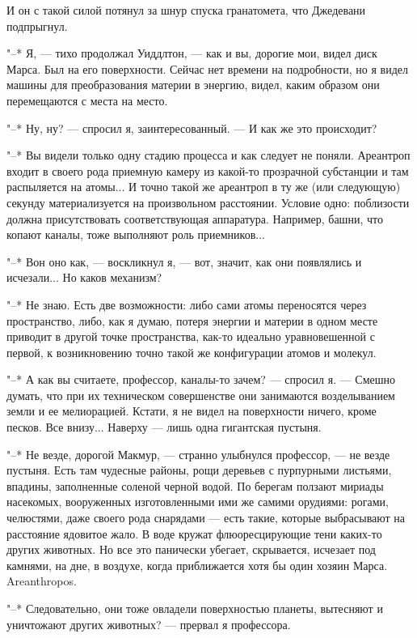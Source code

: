 И он с такой силой потянул за шнур спуска  гранатомета,  что  Джедевани
подпрыгнул.

"--* Я, --- тихо продолжал Уиддлтон, --- как и вы,  дорогие  мои,  видел  диск
Марса. Был на его поверхности. Сейчас нет времени  на  подробности,  но  я
видел машины для преобразования материи в энергию,  видел,  каким  образом
они перемещаются с места на место.

"--* Ну, ну? --- спросил я, заинтересованный. --- И как же это происходит?

"--* Вы видели только одну  стадию  процесса  и  как  следует  не  поняли.
Ареантроп входит в своего рода  приемную  камеру  из  какой-то  прозрачной
субстанции и там распыляется на атомы... И точно такой же ареантроп  в  ту
же (или следующую) секунду  материализуется  на  произвольном  расстоянии.
Условие одно: поблизости должна присутствовать соответствующая аппаратура.
Например, башни, что копают каналы, тоже выполняют роль приемников...

"--* Вон оно как, --- воскликнул я, --- вот,  значит,  как  они  появлялись  и
исчезали... Но каков механизм?

"--* Не знаю. Есть две возможности:  либо  сами  атомы  переносятся  через
пространство, либо, как я думаю, потеря энергии и материи  в  одном  месте
приводит в другой точке пространства,  как-то  идеально  уравновешенной  с
первой, к возникновению точно такой же конфигурации атомов и молекул.

"--* А как вы считаете, профессор, каналы-то зачем? --- спросил я. ---  Смешно
думать, что при их техническом совершенстве они  занимаются  возделыванием
земли и ее мелиорацией. Кстати, я не видел на  поверхности  ничего,  кроме
песков. Все внизу... Наверху --- лишь одна гигантская пустыня.

"--* Не везде, дорогой Макмур, --- странно улыбнулся профессор, ---  не  везде
пустыня. Есть там чудесные районы, рощи деревьев  с  пурпурными  листьями,
впадины, заполненные соленой черной  водой.  По  берегам  ползают  мириады
насекомых, вооруженных изготовленными  ими  же  самими  орудиями:  рогами,
челюстями, даже своего рода снарядами --- есть такие, которые выбрасывают на
расстояние ядовитое жало. В  воде  кружат  флюоресцирующие  тени  каких-то
других животных. Но все это панически убегает,  скрывается,  исчезает  под
камнями, на дне, в воздухе, когда приближается хотя бы один хозяин  Марса.
Areanthropos.

"--* Следовательно, они тоже овладели поверхностью  планеты,  вытесняют  и
уничтожают других животных? --- прервал я профессора.

